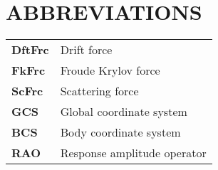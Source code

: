 \chapter*{\centering ABBREVIATIONS}
\vspace{0.5cm}
\begin{table}[h]
\centering
\setlength{\tabcolsep}{12pt}
\renewcommand{\arraystretch}{1.5} %
\begin{tabular}{ll}
    {\bf DftFrc} & Drift force \\
    {\bf FkFrc} & Froude Krylov force \\
    {\bf ScFrc} & Scattering force \\
    {\bf GCS} & Global coordinate system \\
    {\bf BCS} & Body coordinate system \\
    {\bf RAO} & Response amplitude operator \\
\end{tabular}
\end{table}